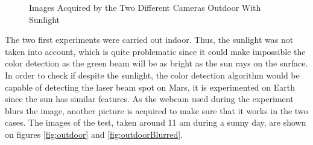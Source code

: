 \begin{figure}[!h] 
\centering
{}
\quad 
\quad 
{}
\caption{Images Acquired by the Two Different Cameras Outdoor With Sunlight} 
\end{figure}

The two first experiments were carried out indoor. Thus, the sunlight was not taken into account, which is quite problematic since it could make impossible the color detection as the green beam will be as bright as the sun rays on the surface. In order to check if despite the sunlight, the color detection algorithm would be capable of detecting the laser beam spot on Mars, it is experimented on Earth since the sun has similar features. As the webcam used during the experiment blurs the image, another picture is acquired to make sure that it works in the two cases. The images of the test, taken around 11 am during a sunny day, are shown on figures \ref{fig:outdoor} and \ref{fig:outdoorBlurred}.

